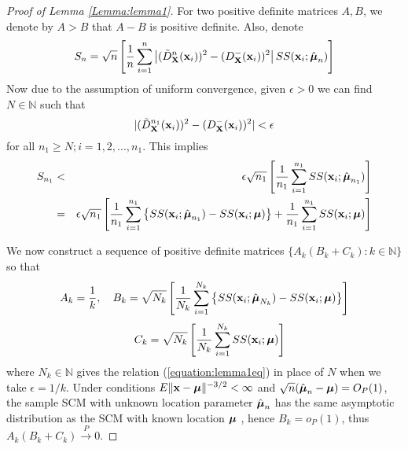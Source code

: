 \begin{proof}[Proof of Lemma \ref{Lemma:lemma1}]
For two positive definite matrices $A,B$, we denote by $A>B$ that $A-B$ is positive definite. Also, denote
%
$$ S_n = \sqrt n \left[ \frac{1}{n} \sum_{i=1}^n \left| (\tilde D^{n} _{\mathbf{X}} ({\bf{x}}_i))^2  - (D^-_{\mathbf{X}} ({\bf{x}}_i))^2 \right| SS({\bf{x}}_i; \hat{{\boldsymbol{\mu}}}_n) \right] $$
%
Now due to the assumption of uniform convergence, given $\epsilon>0$ we can find $N \in \mathbb{N}$ such that
%
\begin{equation}
\label{equation:lemma1eq}
| (\tilde D^{n_1}_{\mathbf{X}}({\bf{x}}_i))^2 - (D^-_{\mathbf{X}}({\bf{x}}_i))^2 | < \epsilon
\end{equation}
%
for all $n_1 \geq N; i = 1,2,...,n_1$. This implies
%
\begin{eqnarray}
\label{eqn:lemma1eq2}
S_{n_1} &< & \epsilon \sqrt{n_1} \left[ \frac{1}{n_1} \sum_{i=1}^{n_1} SS({\bf{x}}_i; \hat{{\boldsymbol{\mu}}}_{n_1}) \right]\notag\\
&=& \epsilon \sqrt{n_1} \left[ \frac{1}{n_1} \sum_{i=1}^{n_1} \left\{ SS({\bf{x}}_i; \hat{{\boldsymbol{\mu}}}_{n_1}) - SS({\bf{x}}_i; {\boldsymbol{\mu}}) \right\} + \frac{1}{n_1} \sum_{i=1}^{n_1} SS({\bf{x}}_i; {\boldsymbol{\mu}}) \right]
\end{eqnarray}

We now construct a sequence of positive definite matrices $\{A_k (B_k+C_k) : k \in \mathbb N\} $ so that
%
$$ A_k = \frac{1}{k}, \quad B_k = \sqrt{N_k} \left[ \frac{1}{N_k} \sum_{i=1}^{N_k} \left\{ SS({\bf{x}}_i; \hat{{\boldsymbol{\mu}}}_{N_k}) - SS({\bf{x}}_i; {\boldsymbol{\mu}}) \right\} \right]$$
$$\quad C_k = \sqrt{N_k} \left[ \frac{1}{N_k} \sum_{i=1}^{N_k} SS({\bf{x}}_i; {\boldsymbol{\mu}}) \right] $$
%
where $N_k \in \mathbb N$ gives the relation (\ref{equation:lemma1eq}) in place of $N$ when we take $\epsilon = 1/k$. Under conditions $ E\|{\bf{x}} - {\boldsymbol{\mu}}\|^{-3/2} < \infty $ and $\sqrt n (\hat{{\boldsymbol{\mu}}}_n - {\boldsymbol{\mu}}) = O_P(1)$, the sample SCM with unknown location parameter $\hat{{\boldsymbol{\mu}}}_n$ has the same asymptotic distribution as the SCM with known location ${\boldsymbol{\mu}}$ \citep{durre14}, hence $B_k = o_P(1)$, thus $A_k (B_k+C_k) \stackrel{P}{\rightarrow} 0$.


\end{proof}
